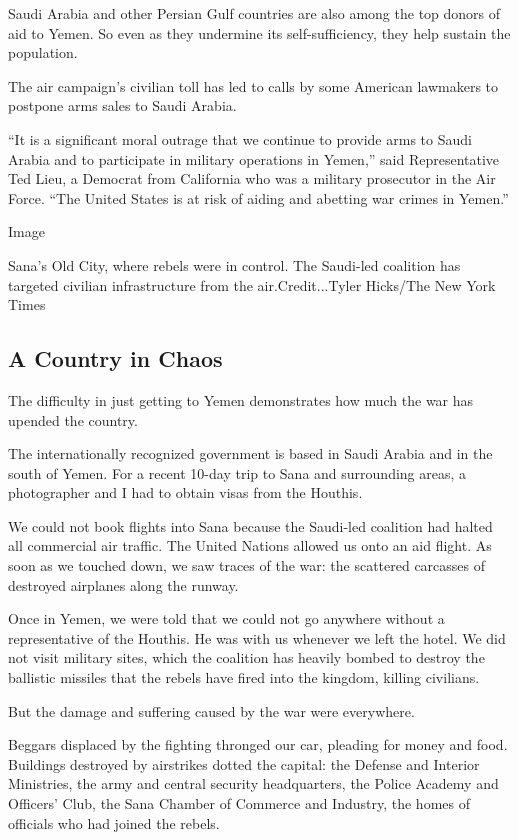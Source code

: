 Saudi Arabia and other Persian Gulf countries are also among the top
donors of aid to Yemen. So even as they undermine its self-sufficiency,
they help sustain the population.

The air campaign's civilian toll has led to calls by some American
lawmakers to postpone arms sales to Saudi Arabia.

``It is a significant moral outrage that we continue to provide arms to
Saudi Arabia and to participate in military operations in Yemen,'' said
Representative Ted Lieu, a Democrat from California who was a military
prosecutor in the Air Force. ``The United States is at risk of aiding
and abetting war crimes in Yemen.''

Image

Sana's Old City, where rebels were in control. The Saudi-led coalition
has targeted civilian infrastructure from the air.Credit...Tyler
Hicks/The New York Times

\hypertarget{a-country-in-chaos}{%
\subsection{A Country in Chaos}\label{a-country-in-chaos}}

The difficulty in just getting to Yemen demonstrates how much the war
has upended the country.

The internationally recognized government is based in Saudi Arabia and
in the south of Yemen. For a recent 10-day trip to Sana and surrounding
areas, a photographer and I had to obtain visas from the Houthis.

We could not book flights into Sana because the Saudi-led coalition had
halted all commercial air traffic. The United Nations allowed us onto an
aid flight. As soon as we touched down, we saw traces of the war: the
scattered carcasses of destroyed airplanes along the runway.

Once in Yemen, we were told that we could not go anywhere without a
representative of the Houthis. He was with us whenever we left the
hotel. We did not visit military sites, which the coalition has heavily
bombed to destroy the ballistic missiles that the rebels have fired into
the kingdom, killing civilians.

But the damage and suffering caused by the war were everywhere.

Beggars displaced by the fighting thronged our car, pleading for money
and food. Buildings destroyed by airstrikes dotted the capital: the
Defense and Interior Ministries, the army and central security
headquarters, the Police Academy and Officers' Club, the Sana Chamber of
Commerce and Industry, the homes of officials who had joined the rebels.

